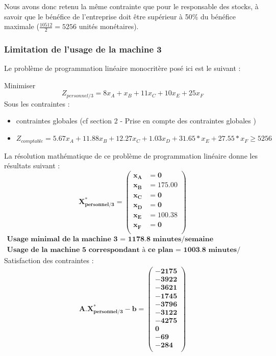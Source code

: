 \documentclass[12pt]{article}
\begin{document}
Nous avons donc retenu la même contrainte que pour le responsable des stocks, à savoir que le bénéfice de l'entreprise doit être supérieur à 50\% du bénéfice maximale ($\frac{10512}{2} = 5256$ unités monétaires).
\subsubsection{Limitation de l'usage de la machine 3}
Le problème de programmation linéaire monocritère posé ici est le suivant :
\begin{tcolorbox}
Minimiser
\begin{equation*}
 Z_{personnel/3}= 8x_{A} + x_{B} + 11x_{C} + 10x_{E} + 25x_{F}
\end{equation*}
Sous les contraintes :
\begin{itemize}
\item contraintes globales (cf section 2 - Prise en compte des contraintes globales )
\item $ Z_{comptable}= 5.67x_{A} +11.88x_{B} +12.27x_{C} +1.03x_{D} +31.65*x_{E} +27.55*x_{F} \geq 5256$
\end{itemize}
\end{tcolorbox}
La résolution mathématique de ce problème de programmation linéaire donne les résultats suivant :\\
\begin{equation*}
\boldsymbol{X^{*}_{personnel/3} = 
   \left (
   \begin{aligned}
      x_{A} &= 0 \\
      x_{B} &= 175.00 \\
      x_{C} &= 0 \\
      x_{D} &= 0 \\
      x_{E} &= 100.38 \\ 
      x_{F} &= 0 \\
   \end{aligned}
   \right )
 } 
\end{equation*}
\begin{align*}
\textbf{Usage minimal de la machine 3 = 1178.8 minutes/semaine}\\
\textbf{Usage de la machine 5 correspondant à ce plan = 1003.8 minutes/semaine}
\end{align*}
Satisfaction des contraintes : 
\begin{align*}
\boldsymbol{A.X^{*}_{personnel/3} - b = 
   \left (
   \begin{aligned}
      -2175 \\
      -3922 \\
      -3621 \\
      -1745 \\
      -3796 \\
      -3122 \\
      -4275 \\
      0 \\
      -69 \\
      -284\\
   \end{aligned}
   \right )
 } 
\end{align*}
\end{document}
